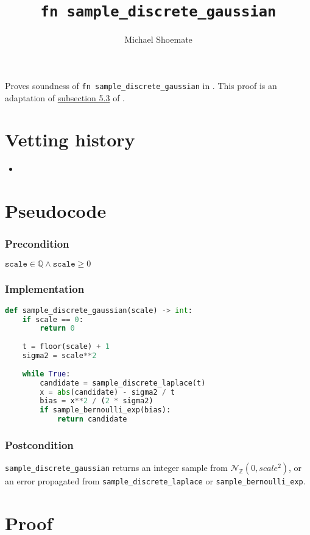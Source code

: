 \documentclass{article}
\title{\texttt{fn sample\_discrete\_gaussian}}
\author{Michael Shoemate}
\begin{document}
\maketitle

\contrib
Proves soundness of \texttt{fn sample\_discrete\_gaussian} in .
This proof is an adaptation of \href{https://arxiv.org/pdf/2004.00010.pdf#subsection.5.3}{subsection 5.3} of \cite{CKS20}.

\section{Vetting history}
\begin{itemize}
    \item {}
\end{itemize}

\section{Pseudocode}
\subsubsection*{Precondition}
$\texttt{scale} \in \mathbb{Q} \land \texttt{scale} \geq 0$

\subsubsection*{Implementation}        
\begin{lstlisting}[language=Python]
def sample_discrete_gaussian(scale) -> int:
    if scale == 0:
        return 0
    
    t = floor(scale) + 1
    sigma2 = scale**2
    
    while True:
        candidate = sample_discrete_laplace(t)
        x = abs(candidate) - sigma2 / t
        bias = x**2 / (2 * sigma2)
        if sample_bernoulli_exp(bias):
            return candidate
\end{lstlisting}

\subsubsection*{Postcondition}
\texttt{sample\_discrete\_gaussian} returns an integer sample from $\mathcal{N}_\mathbb{Z}(0, scale^2)$, or an error propagated from \texttt{sample\_discrete\_laplace} or \texttt{sample\_bernoulli\_exp}.

\section{Proof}
\end{document}
